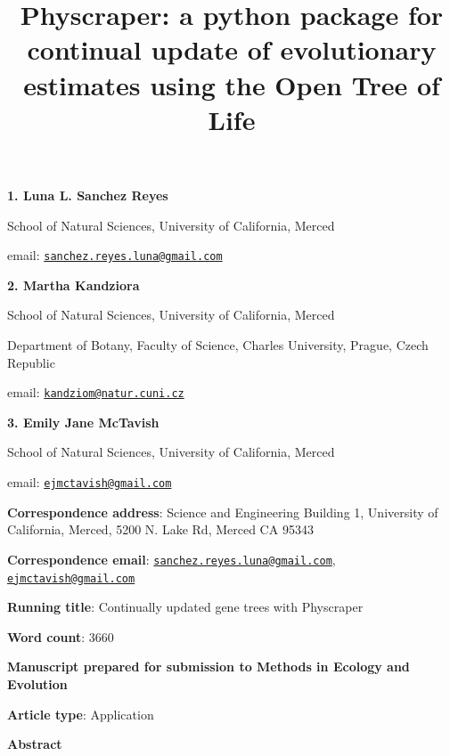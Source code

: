 \documentclass[]{article}
\title{Physcraper: a python package for continual update of evolutionary estimates using the Open Tree of Life}
\author{}
\date{\vspace{-2.5em}}
\begin{document}
\maketitle

\textbf{1. Luna L. Sanchez Reyes}

School of Natural Sciences, University of California, Merced

email: \href{mailto:sanchez.reyes.luna@gmail.com}{\nolinkurl{sanchez.reyes.luna@gmail.com}}

\textbf{2. Martha Kandziora}

School of Natural Sciences, University of California, Merced

Department of Botany, Faculty of Science, Charles University, Prague, Czech Republic

email: \href{mailto:kandziom@natur.cuni.cz}{\nolinkurl{kandziom@natur.cuni.cz}}

\textbf{3. Emily Jane McTavish}

School of Natural Sciences, University of California, Merced

email: \href{mailto:ejmctavish@gmail.com}{\nolinkurl{ejmctavish@gmail.com}}

\textbf{Correspondence address}: Science and Engineering Building 1, University of California, Merced, 5200 N. Lake Rd, Merced CA 95343

\textbf{Correspondence email}: \href{mailto:sanchez.reyes.luna@gmail.com}{\nolinkurl{sanchez.reyes.luna@gmail.com}}, \href{mailto:ejmctavish@gmail.com}{\nolinkurl{ejmctavish@gmail.com}}

\textbf{Running title}: Continually updated gene trees with Physcraper

\textbf{Word count}: 3660

\textbf{Manuscript prepared for submission to Methods in Ecology and Evolution}

\textbf{Article type}: Application

\newpage

\begingroup\Large

\textbf{Abstract}
\endgroup
\end{document}
